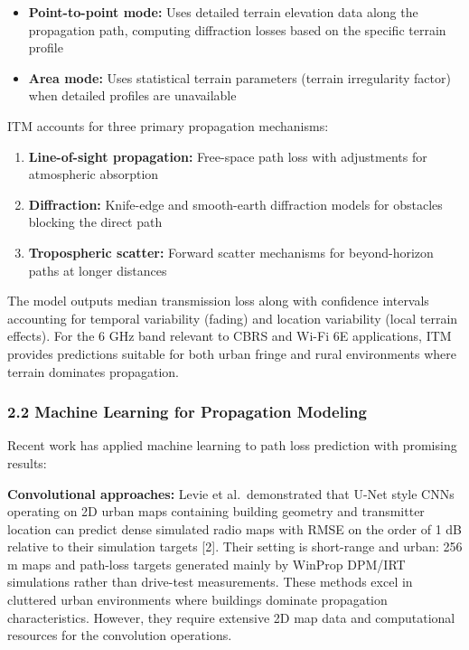 \documentclass[
]{article}
\providecommand{\tightlist}{%
  \setlength{\itemsep}{0pt}\setlength{\parskip}{0pt}}
\begin{document}
\begin{itemize}
\tightlist
\item
  \textbf{Point-to-point mode:} Uses detailed terrain elevation data
  along the propagation path, computing diffraction losses based on the
  specific terrain profile
\item
  \textbf{Area mode:} Uses statistical terrain parameters (terrain
  irregularity factor) when detailed profiles are unavailable
\end{itemize}

ITM accounts for three primary propagation mechanisms:

\begin{enumerate}
\def\labelenumi{\arabic{enumi}.}
\tightlist
\item
  \textbf{Line-of-sight propagation:} Free-space path loss with
  adjustments for atmospheric absorption
\item
  \textbf{Diffraction:} Knife-edge and smooth-earth diffraction models
  for obstacles blocking the direct path
\item
  \textbf{Tropospheric scatter:} Forward scatter mechanisms for
  beyond-horizon paths at longer distances
\end{enumerate}

The model outputs median transmission loss along with confidence
intervals accounting for temporal variability (fading) and location
variability (local terrain effects). For the 6 GHz band relevant to CBRS
and Wi-Fi 6E applications, ITM provides predictions suitable for both
urban fringe and rural environments where terrain dominates propagation.

\subsubsection{2.2 Machine Learning for Propagation
Modeling}\label{machine-learning-for-propagation-modeling}

Recent work has applied machine learning to path loss prediction with
promising results:

\textbf{Convolutional approaches:} Levie et al.~demonstrated that U-Net
style CNNs operating on 2D urban maps containing building geometry and
transmitter location can predict dense simulated radio maps with RMSE on
the order of 1 dB relative to their simulation targets {[}2{]}. Their
setting is short-range and urban: 256 m maps and path-loss targets
generated mainly by WinProp DPM/IRT simulations rather than drive-test
measurements. These methods excel in cluttered urban environments where
buildings dominate propagation characteristics. However, they require
extensive 2D map data and computational resources for the convolution
operations.
\end{document}
